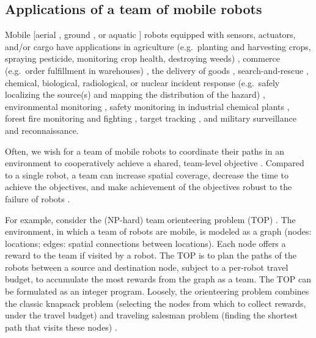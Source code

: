 \documentclass[11pt, oneside]{article}
\begin{document}
\subsection{Applications of a team of mobile robots}
Mobile [aerial \cite{leutenegger2016flying}, ground \cite{chung2016wheeled}, or aquatic \cite{choi2016underwater}] robots equipped with sensors, actuators, and/or cargo have applications in agriculture (e.g.\ planting and harvesting crops, spraying pesticide, monitoring crop health, destroying weeds) \cite{santos2020path,bawden2017robot,mcallister2018multi}, commerce (e.g.\ order fulfillment in warehouses) \cite{wurman2008coordinating}, the delivery of goods \cite{coelho2014thirty}, search-and-rescue \cite{queralta2020collaborative,rouvcek2020darpa}, chemical, biological, radiological, or nuclear incident response (e.g.\ safely localizing the source(s) and mapping the distribution of the hazard) \cite{murphy2012projected,hutchinson2019unmanned}, environmental monitoring \cite{dunbabin2012robots,hernandez2012mobile,yuan2020maritime}, safety monitoring in industrial chemical plants \cite{soldan2014towards,francis2022gas}, forest fire monitoring and fighting \cite{merino2012unmanned}, target tracking \cite{robin2016multi}, and military surveillance and reconnaissance. 

Often, we wish for a team of mobile robots to coordinate their paths in an environment to cooperatively achieve a shared, team-level objective \cite{parker1995design,parker2007distributed}.
Compared to a single robot, a team can increase spatial coverage, decrease the time to achieve the objectives, and make achievement of the objectives robust to the failure of robots \cite{schranz2020swarm,brambilla2013swarm}.


For example, consider the (NP-hard) team orienteering \cite{golden1987orienteering} problem (TOP) \cite{chao1996team,gunawan2016orienteering,vansteenwegen2011orienteering}. 
The environment, in which a team of robots are mobile, is modeled as a graph (nodes: locations; edges: spatial connections between locations). Each node offers a reward to the team if visited by a robot.
The TOP is to plan the paths of the robots between a source and destination node, subject to a per-robot travel budget, to accumulate the most rewards from the graph as a team. The TOP can be formulated as an integer program. Loosely, the orienteering problem combines the classic knapsack problem (selecting the nodes from which to collect rewards, under the travel budget) and traveling salesman problem (finding the shortest path that visits these nodes) \cite{vansteenwegen2011orienteering}.
\end{document}

